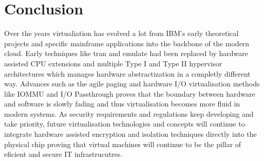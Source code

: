 \section{Conclusion}
Over the years virtualiation has evolved a lot from IBM's early theoretical projects and specific mainframe applications into the backbone of the modern cloud. Early techniques like tran and emulate had been replaced by hardware assisted CPU extensions and multiple Type I and Type II hypervisor architectures which manages hardware abstractization in a completly different way. Advances such as the agile paging and hardware I/O virtualisation methods like IOMMU and I/O Passthrough proves that the boundary between hardware and software is slowly fading and thus virtualisation becomes more fluid in modern systems. As security requirements and regulations keep developing and take priority, future virtualisation technologies and concepts will continue to integrate hardware assisted encryption and isolation techniques directly into the physical chip proving that virtual machines will continue to be the pillar of eficient and secure IT infrastrucutres. 